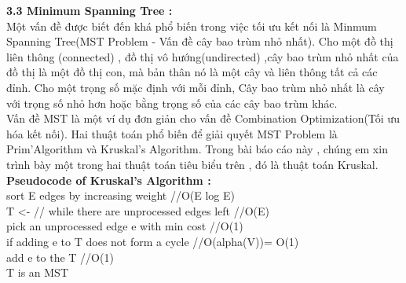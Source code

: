 \documentclass{article}
\begin{document}
	\begin{flushleft}
		\fontsize{14pt}{22pt}\selectfont
		\textbf{3.3 Minimum Spanning Tree :}\\
		\hspace{0.86cm}Một vấn đề được biết đến khá phổ biến trong việc tối ưu kết nối là Minmum Spanning Tree(MST Problem - Vấn đề cây bao trùm nhỏ nhất). Cho một đồ thị liên thông (connected) , đồ thị vô hướng(undirected) ,cây bao trùm nhỏ nhất của đồ thị là một đồ thị con, mà bản thân nó là một cây và liên thông tất cả các đỉnh. Cho một trọng số mặc định với mỗi đỉnh, Cây bao trùm nhỏ nhất là cây với trọng số nhỏ hơn hoặc bằng trọng số của các cây bao trùm khác.\\
		\hspace{0.86cm}	Vấn đề MST là một ví dụ đơn giản cho vấn đề Combination Optimization(Tối ưu hóa kết nối). Hai thuật toán phổ biến để giải quyết MST Problem là Prim'Algorithm và Kruskal's Algorithm. Trong bài báo cáo này , chúng em xin trình bày một trong hai thuật toán tiêu biểu trên , đó là thuật toán Kruskal.\\
		\hspace{0.86cm}\textbf{Pseudocode of Kruskal's Algorithm :}\\
		sort E edges by increasing weight //O(E log E)\\
		T <- {}//
		while there are unprocessed edges left //O(E)\\
		\hspace{0.5cm}pick an unprocessed edge e with min cost //O(1)\\
		\hspace{0.5cm}if adding e to T does not form a cycle //O(alpha(V))= O(1)\\
		\hspace{1cm}add e to the T //O(1)\\
		T is an MST \\
	\end{flushleft}
\end{document}
